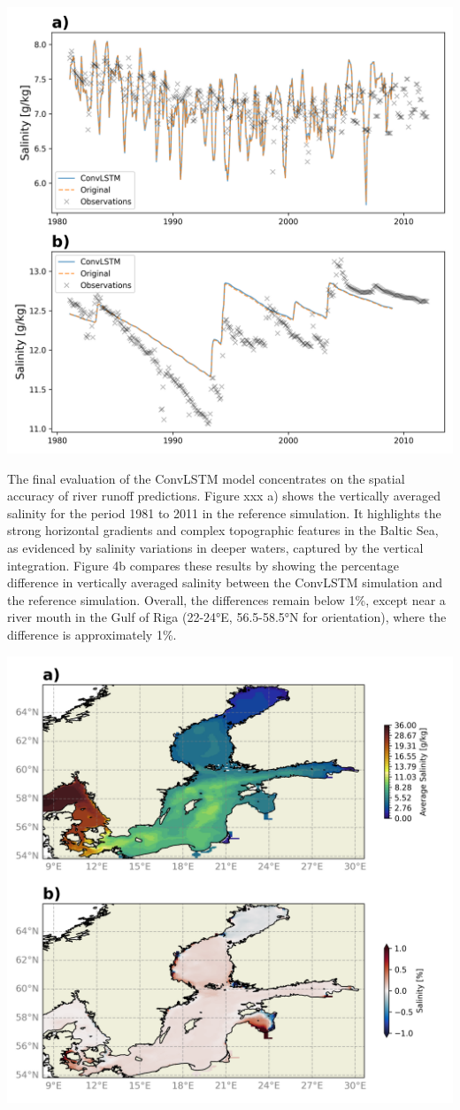 \documentclass[
]{agujournal2019}
\begin{document}
\includegraphics{../src/figures/by15_model.png}

The final evaluation of the ConvLSTM model concentrates on the spatial
accuracy of river runoff predictions. Figure xxx a) shows the vertically
averaged salinity for the period 1981 to 2011 in the reference
simulation. It highlights the strong horizontal gradients and complex
topographic features in the Baltic Sea, as evidenced by salinity
variations in deeper waters, captured by the vertical integration.
Figure 4b compares these results by showing the percentage difference in
vertically averaged salinity between the ConvLSTM simulation and the
reference simulation. Overall, the differences remain below 1\%, except
near a river mouth in the Gulf of Riga (22-24°E, 56.5-58.5°N for
orientation), where the difference is approximately 1\%.

\includegraphics{../src/figures/evaluation_MOM.png}
\end{document}
